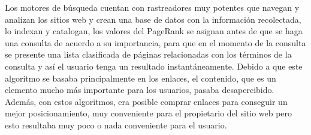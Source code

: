 \documentclass[11pt]{article}
\begin{document}
Los motores de búsqueda cuentan con rastreadores muy potentes que navegan y analizan los sitios web y crean una base de datos con la información recolectada, lo indexan y catalogan, los valores del PageRank se asignan antes de que se haga una consulta de acuerdo a su importancia, para que en el momento de la consulta se presente una lista clasificada de páginas relacionadas con los términos de la consulta y así el usuario tenga un resultado instantáneamente.
Debido a que este algoritmo se basaba principalmente en los enlaces, el contenido, que es un elemento mucho más importante para los usuarios, pasaba desapercibido. Además, con estos algoritmos, era posible comprar enlaces para conseguir un mejor posicionamiento, muy conveniente para el propietario del sitio web pero esto resultaba muy poco o nada conveniente para el usuario. 
\end{document}
